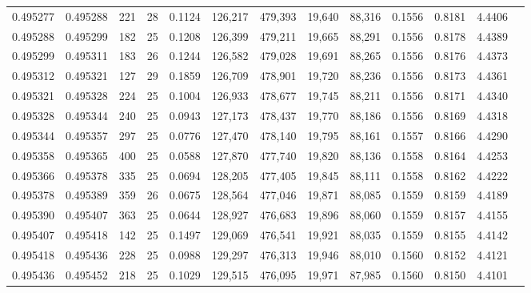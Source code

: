 \begin{tabular}{rrrrrrrrrrrrr}
0.495277 & 0.495288 & 221 &  28 &                                     0.1124 & 126,217 & 479,393 &  19,640 &  88,316 & 0.1556 & 0.8181 & 4.4406 \\
0.495288 & 0.495299 & 182 &  25 &                                     0.1208 & 126,399 & 479,211 &  19,665 &  88,291 & 0.1556 & 0.8178 & 4.4389 \\
0.495299 & 0.495311 & 183 &  26 &                                     0.1244 & 126,582 & 479,028 &  19,691 &  88,265 & 0.1556 & 0.8176 & 4.4373 \\
0.495312 & 0.495321 & 127 &  29 &                                     0.1859 & 126,709 & 478,901 &  19,720 &  88,236 & 0.1556 & 0.8173 & 4.4361 \\
0.495321 & 0.495328 & 224 &  25 &                                     0.1004 & 126,933 & 478,677 &  19,745 &  88,211 & 0.1556 & 0.8171 & 4.4340 \\
0.495328 & 0.495344 & 240 &  25 &                                     0.0943 & 127,173 & 478,437 &  19,770 &  88,186 & 0.1556 & 0.8169 & 4.4318 \\
0.495344 & 0.495357 & 297 &  25 &                                     0.0776 & 127,470 & 478,140 &  19,795 &  88,161 & 0.1557 & 0.8166 & 4.4290 \\
0.495358 & 0.495365 & 400 &  25 &                                     0.0588 & 127,870 & 477,740 &  19,820 &  88,136 & 0.1558 & 0.8164 & 4.4253 \\
0.495366 & 0.495378 & 335 &  25 &                                     0.0694 & 128,205 & 477,405 &  19,845 &  88,111 & 0.1558 & 0.8162 & 4.4222 \\
0.495378 & 0.495389 & 359 &  26 &                                     0.0675 & 128,564 & 477,046 &  19,871 &  88,085 & 0.1559 & 0.8159 & 4.4189 \\
0.495390 & 0.495407 & 363 &  25 &                                     0.0644 & 128,927 & 476,683 &  19,896 &  88,060 & 0.1559 & 0.8157 & 4.4155 \\
0.495407 & 0.495418 & 142 &  25 &                                     0.1497 & 129,069 & 476,541 &  19,921 &  88,035 & 0.1559 & 0.8155 & 4.4142 \\
0.495418 & 0.495436 & 228 &  25 &                                     0.0988 & 129,297 & 476,313 &  19,946 &  88,010 & 0.1560 & 0.8152 & 4.4121 \\
0.495436 & 0.495452 & 218 &  25 &                                     0.1029 & 129,515 & 476,095 &  19,971 &  87,985 & 0.1560 & 0.8150 & 4.4101 \\

\end{tabular}
